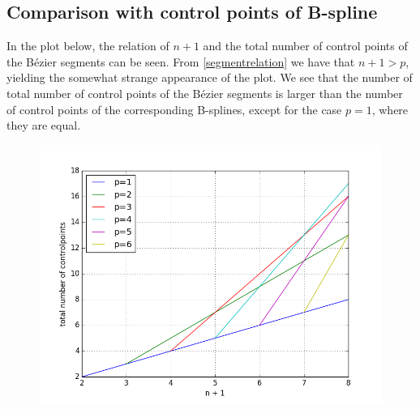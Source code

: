 \documentclass[]{article}
\begin{document}
\subsection*{Comparison with control points of B-spline}
In the plot below, the relation of $n+1$ and the total number of control points of the B\'{e}zier segments can be seen. From \eqref{segmentrelation} we have that $n+1>p$, yielding the somewhat strange appearance of the plot. We see that the number of total number of control points of the B\'{e}zier segments is larger than the number of control points of the corresponding B-splines, except for the case $p=1$, where they are equal.
\begin{figure}[h!]
\includegraphics[scale=0.6]{segmentrelation}
\end{figure}
\end{document}
